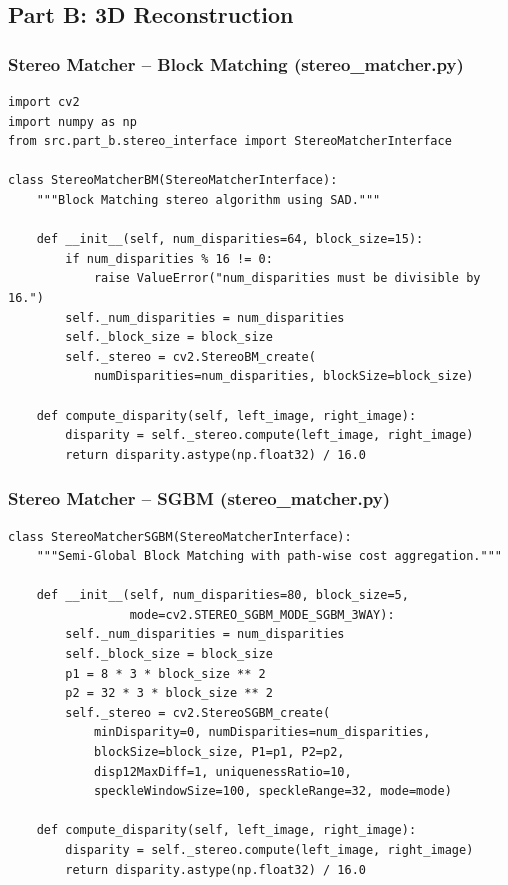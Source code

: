\documentclass[a4paper,12pt]{article}
\begin{document}
\subsection{Part B: 3D Reconstruction}

\subsubsection*{Stereo Matcher -- Block Matching (stereo\_matcher.py)}
\begin{lstlisting}
import cv2
import numpy as np
from src.part_b.stereo_interface import StereoMatcherInterface

class StereoMatcherBM(StereoMatcherInterface):
    """Block Matching stereo algorithm using SAD."""

    def __init__(self, num_disparities=64, block_size=15):
        if num_disparities % 16 != 0:
            raise ValueError("num_disparities must be divisible by 16.")
        self._num_disparities = num_disparities
        self._block_size = block_size
        self._stereo = cv2.StereoBM_create(
            numDisparities=num_disparities, blockSize=block_size)

    def compute_disparity(self, left_image, right_image):
        disparity = self._stereo.compute(left_image, right_image)
        return disparity.astype(np.float32) / 16.0
\end{lstlisting}

\subsubsection*{Stereo Matcher -- SGBM (stereo\_matcher.py)}
\begin{lstlisting}
class StereoMatcherSGBM(StereoMatcherInterface):
    """Semi-Global Block Matching with path-wise cost aggregation."""

    def __init__(self, num_disparities=80, block_size=5,
                 mode=cv2.STEREO_SGBM_MODE_SGBM_3WAY):
        self._num_disparities = num_disparities
        self._block_size = block_size
        p1 = 8 * 3 * block_size ** 2
        p2 = 32 * 3 * block_size ** 2
        self._stereo = cv2.StereoSGBM_create(
            minDisparity=0, numDisparities=num_disparities,
            blockSize=block_size, P1=p1, P2=p2,
            disp12MaxDiff=1, uniquenessRatio=10,
            speckleWindowSize=100, speckleRange=32, mode=mode)

    def compute_disparity(self, left_image, right_image):
        disparity = self._stereo.compute(left_image, right_image)
        return disparity.astype(np.float32) / 16.0
\end{lstlisting}
\end{document}

